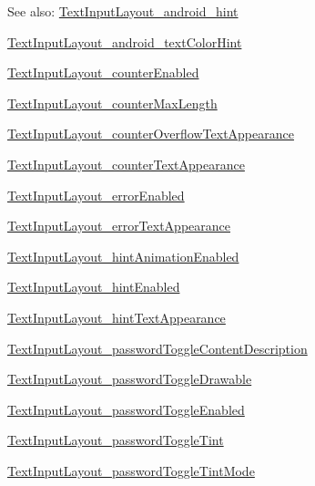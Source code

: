 \begin{Desc}
\item[See also:]\hyperlink{classandroid_1_1support_1_1v4_1_1_r_1_1styleable_2296977f7a733d53ec47e700d4130151}{TextInputLayout\_\-android\_\-hint} 

\hyperlink{classandroid_1_1support_1_1v4_1_1_r_1_1styleable_1e92f2247843ef875eda6c3045e73bbd}{TextInputLayout\_\-android\_\-textColorHint} 

\hyperlink{classandroid_1_1support_1_1v4_1_1_r_1_1styleable_93a894bdcf077508cc30b9d7bfa9662d}{TextInputLayout\_\-counterEnabled} 

\hyperlink{classandroid_1_1support_1_1v4_1_1_r_1_1styleable_a890e200b03fe1fa48be3fe870435e18}{TextInputLayout\_\-counterMaxLength} 

\hyperlink{classandroid_1_1support_1_1v4_1_1_r_1_1styleable_0666dd9e90421e9415028a87a4bfd4d3}{TextInputLayout\_\-counterOverflowTextAppearance} 

\hyperlink{classandroid_1_1support_1_1v4_1_1_r_1_1styleable_e2035c0839f7355fa9fda8b0c9a8dd46}{TextInputLayout\_\-counterTextAppearance} 

\hyperlink{classandroid_1_1support_1_1v4_1_1_r_1_1styleable_552cb08a36003494a2f75ebfe70de3f7}{TextInputLayout\_\-errorEnabled} 

\hyperlink{classandroid_1_1support_1_1v4_1_1_r_1_1styleable_5d6bfe2c5003f1a81addf1df4b6e7503}{TextInputLayout\_\-errorTextAppearance} 

\hyperlink{classandroid_1_1support_1_1v4_1_1_r_1_1styleable_13f535700725e41671bac1815f26fc74}{TextInputLayout\_\-hintAnimationEnabled} 

\hyperlink{classandroid_1_1support_1_1v4_1_1_r_1_1styleable_a55fe41974b69e81336cb0c2750c45fd}{TextInputLayout\_\-hintEnabled} 

\hyperlink{classandroid_1_1support_1_1v4_1_1_r_1_1styleable_c535b56b26e64b26c7f84158fc06f41a}{TextInputLayout\_\-hintTextAppearance} 

\hyperlink{classandroid_1_1support_1_1v4_1_1_r_1_1styleable_bf936cf60adff593b4d8f71e2914568b}{TextInputLayout\_\-passwordToggleContentDescription} 

\hyperlink{classandroid_1_1support_1_1v4_1_1_r_1_1styleable_868c1aeee5f74a15faca475df88aafc1}{TextInputLayout\_\-passwordToggleDrawable} 

\hyperlink{classandroid_1_1support_1_1v4_1_1_r_1_1styleable_42d6b9f952af765e6e832381e786bcd8}{TextInputLayout\_\-passwordToggleEnabled} 

\hyperlink{classandroid_1_1support_1_1v4_1_1_r_1_1styleable_b9b1edb6651d08b5764eaf9bb8fb1d98}{TextInputLayout\_\-passwordToggleTint} 

\hyperlink{classandroid_1_1support_1_1v4_1_1_r_1_1styleable_d9463181356179330f3502a4a7936e5a}{TextInputLayout\_\-passwordToggleTintMode} \end{Desc}
